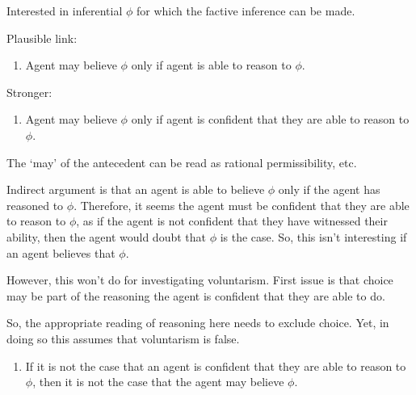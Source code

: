 \documentclass[10pt]{article}
\begin{document}
Interested in inferential \(\phi\) for which the factive inference can be made.

Plausible link:
\begin{enumerate}
\item Agent may believe \(\phi\) only if agent is able to reason to \(\phi\).
\end{enumerate}

Stronger:
\begin{enumerate}
\item Agent may believe \(\phi\) only if agent is confident that they are able to reason to \(\phi\).
\end{enumerate}

The `may' of the antecedent can be read as rational permissibility, etc.

Indirect argument is that an agent is able to believe \(\phi\) only if the agent has reasoned to \(\phi\).
Therefore, it seems the agent must be confident that they are able to reason to \(\phi\), as if the agent is not confident that they have witnessed their ability, then the agent would doubt that \(\phi\) is the case.
So, this isn't interesting if an agent believes that \(\phi\).

However, this won't do for investigating voluntarism.
First issue is that choice may be part of the reasoning the agent is confident that they are able to do.

So, the appropriate reading of reasoning here needs to exclude choice.
Yet, in doing so this assumes that voluntarism is false.


\begin{enumerate}
\item If it is not the case that an agent is confident that they are able to reason to \(\phi\), then it is not the case that the agent may believe \(\phi\).
\end{enumerate}
\end{document}
